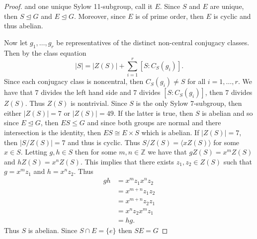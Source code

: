 \documentclass[12pt]{article}
\begin{document}
\begin{enumerate}
\begin{enumerate}[(a)]
\begin{proof}
                        and one unique Sylow 11-subgroup, call it $E$. Since
                        $S$ and $E$ are unique, then $S\unlhd G$ and $E\unlhd G$. 
                        Moreover, since $E$ is of prime order, then $E$ is
                        cyclic and thus abelian.\par\hspace{4mm} Now let $g_1,
                        \dots, g_r$ be representatives of the distinct
                        non-central conjugacy classes. Then by the class
                        equation
                        \begin{equation*}
                            |S|=|Z(S)|+\sum_{i=1}^{r}[S:C_S(g_i)].
                        \end{equation*}
                        Since each conjugacy class is noncentral, then
                        $C_S(g_i)\neq S$ for all $i=1, \dots, r$. We have that
                        $7$ divides the left hand side and $7$ divides
                        $[S:C_S(g_i)]$, then $7$ divides $Z(S)$. Thus $Z(S)$ is
                        nontrivial. Since $S$ is the only Sylow 7-subgroup,
                        then either $|Z(S)|=7$ or $|Z(S)|=49$. If the latter is
                        true, then $S$ is abelian and so since $E\unlhd G$,
                        then $ES\leq G$ and since both groups are normal and
                        there intersection is the identity, then $ES\cong
                        E\times S$ which is abelian. If $|Z(S)|=7$, then
                        $|S/Z(S)|=7$ and thus is cyclic. Thus $S/Z(S)=\langle
                        xZ(S)\rangle$ for some $x\in S$. Letting $g, h\in S$
                        then for some $m, n\in\mathbb{Z}$ we have that
                        $gZ(S)=x^mZ(S)$ and $hZ(S)=x^nZ(S)$. This implies that
                        there exists $z_1, z_2\in Z(S)$ such that $g=x^mz_1$
                        and $h=x^nz_2$. Thus 
                        \begin{align*}
                            gh &=x^mz_1x^nz_2 \\
                            &=x^{m+n}z_1z_2 \\
                            &=x^{m+n}z_2z_1 \\
                            &=x^nz_2x^mz_1 \\
                            &=hg.
                        \end{align*}
                        Thus $S$ is abelian. Since $S\cap E=\{e\}$ then $SE=G$

\end{proof}
\end{enumerate}
\end{enumerate}
\end{document}
